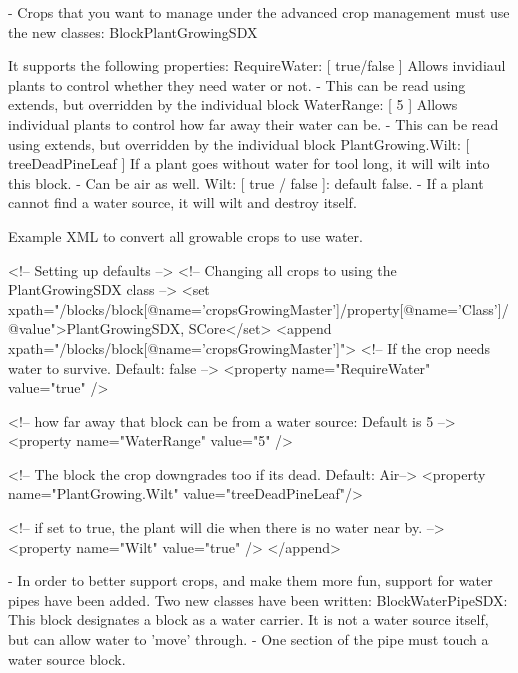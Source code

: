 \begin{DoxyVerb}    - Crops that you want to manage under the advanced crop management must use the new classes:
        BlockPlantGrowingSDX

        It supports the following properties:
            RequireWater: [ true/false ]
                Allows invidiaul plants to control whether they need water or not. 
                - This can be read using extends, but overridden by the individual block
            WaterRange: [ 5 ]
                Allows individual plants to control how far away their water can be.
                - This can be read using extends, but overridden by the individual block
            PlantGrowing.Wilt: [ treeDeadPineLeaf ]
                If a plant goes without water for tool long, it will wilt into this block.
                - Can be air as well.
            Wilt: [ true / false ]: default false.
                - If a plant cannot find a water source, it will wilt and destroy itself.

        Example XML to convert all growable crops to use water.

            <!-- Setting up defaults -->
            <!-- Changing all crops to using the PlantGrowingSDX class -->
            <set xpath="/blocks/block[@name='cropsGrowingMaster']/property[@name='Class']/@value">PlantGrowingSDX, SCore</set>
            <append xpath="/blocks/block[@name='cropsGrowingMaster']">
                <!-- If the crop needs water to survive. Default: false -->
                <property name="RequireWater" value="true" /> 

                <!-- how far away that block can be from a water source: Default is 5 -->
                <property name="WaterRange" value="5" />  

                <!-- The block the crop downgrades too if its dead. Default: Air-->
                <property name="PlantGrowing.Wilt" value="treeDeadPineLeaf"/>

                <!-- if set to true, the plant will die when there is no water near by. -->
                <property name="Wilt" value="true" />
            </append>

    - In order to better support crops, and make them more fun, support for water pipes have been added.
        Two new classes have been written:
            BlockWaterPipeSDX: This block designates a block as a water carrier. It is not a water source itself, but can allow water to 'move' through. 
                - One section of the pipe must touch a water source block.


\end{DoxyVerb}
